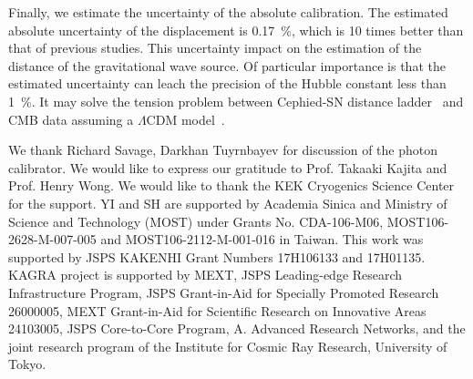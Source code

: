 \documentclass[A4]{spie}  %
\begin{document}
Finally, we estimate the uncertainty of the absolute calibration. The estimated absolute uncertainty of the displacement is 0.17~\%, which is 10 times better than that of previous studies. This uncertainty impact on the estimation of the distance of the gravitational wave source. Of particular importance is that the estimated uncertainty can leach the precision of the Hubble constant less than 1~\%. It may solve the tension problem between Cephied-SN distance ladder~\cite{Riess_2016} and CMB data assuming a $\Lambda$CDM 
model~\cite{2016-planck}.
\acknowledgments     %
 
We thank Richard Savage, Darkhan Tuyrnbayev for discussion of the photon calibrator. We would like to express our gratitude to Prof. Takaaki Kajita and Prof. Henry Wong. We would like to thank the KEK Cryogenics Science Center for the support. YI and SH are supported by Academia Sinica and Ministry of Science and Technology (MOST) under Grants No. CDA-106-M06, MOST106-2628-M-007-005 and MOST106-2112-M-001-016 in Taiwan. This work was supported by JSPS KAKENHI Grant Numbers 17H106133 and 17H01135. KAGRA project is supported by MEXT, JSPS Leading-edge Research Infrastructure Program, JSPS Grant-in-Aid for Specially Promoted Research 26000005, MEXT Grant-in-Aid for Scientific Research on Innovative Areas 24103005, JSPS Core-to-Core Program, A. Advanced Research Networks, and the joint research program of the Institute for Cosmic Ray Research, University of Tokyo.


\end{document}
